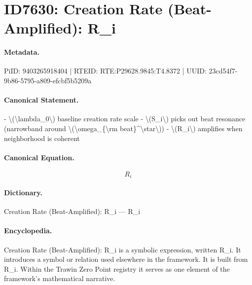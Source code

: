 \section*{ID7630: Creation Rate (Beat-Amplified): R\_i}
\paragraph{Metadata.}
PiID: 9403265918404 | RTEID: RTE:P29628.9845:T4.8372 | UUID: 23cd54f7-9b86-5795-a809-efcbf5b5209a

\paragraph{Canonical Statement.}
- \textbackslash{}(\textbackslash{}lambda\_0\textbackslash{}) baseline creation rate scale - \textbackslash{}(S\_i\textbackslash{}) picks out beat resonance (narrowband around \textbackslash{}(\textbackslash{}omega\_\{\textbackslash{}rm beat\}\textasciicircum{}\textbackslash{}star\textbackslash{})) - \textbackslash{}(R\_i\textbackslash{}) amplifies when neighborhood is coherent

\paragraph{Canonical Equation.}
\[
R_i
\]

\paragraph{Dictionary.}
Creation Rate (Beat-Amplified): R\_i — R\_i

\paragraph{Encyclopedia.}
Creation Rate (Beat-Amplified): R\_i is a symbolic expression, written R\_i. It introduces a symbol or relation used elsewhere in the framework. It is built from R\_i. Within the Trawin Zero Point registry it serves as one element of the framework's mathematical narrative.
